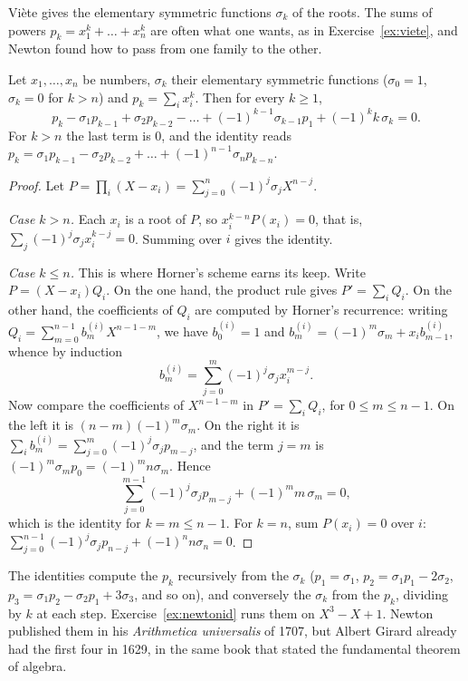Vi\`ete gives the elementary symmetric functions $\sigma_k$ of the roots. The sums of powers $p_k=x_1^k+\dots+x_n^k$ are often what one wants, as
in Exercise~\ref{ex:viete}, and Newton found how to pass from one family to the other.

\begin{proposition}\label{prop:newtonid}
Let $x_1,\dots,x_n$ be numbers, $\sigma_k$ their elementary symmetric functions ($\sigma_0=1$, $\sigma_k=0$ for $k>n$) and $p_k=\sum_ix_i^k$.
Then for every $k\ge1$,
\[
p_k-\sigma_1p_{k-1}+\sigma_2p_{k-2}-\dots+(-1)^{k-1}\sigma_{k-1}p_1+(-1)^kk\,\sigma_k=0.
\]
For $k>n$ the last term is $0$, and the identity reads $p_k=\sigma_1p_{k-1}-\sigma_2p_{k-2}+\dots+(-1)^{n-1}\sigma_np_{k-n}$.
\end{proposition}
\begin{proof}
Let $P=\prod_i(X-x_i)=\sum_{j=0}^n(-1)^j\sigma_jX^{n-j}$.

\emph{Case $k>n$.} Each $x_i$ is a root of $P$, so $x_i^{k-n}P(x_i)=0$, that is, $\sum_j(-1)^j\sigma_jx_i^{k-j}=0$. Summing over $i$ gives the identity.

\emph{Case $k\le n$.} This is where Horner's scheme earns its keep. Write $P=(X-x_i)Q_i$. On the one hand, the product rule gives
$P'=\sum_iQ_i$. On the other hand, the coefficients of $Q_i$ are computed by Horner's recurrence: writing $Q_i=\sum_{m=0}^{n-1}b_m^{(i)}X^{n-1-m}$,
we have $b_0^{(i)}=1$ and $b_m^{(i)}=(-1)^m\sigma_m+x_ib_{m-1}^{(i)}$, whence by induction
\[
b_m^{(i)}=\sum_{j=0}^m(-1)^j\sigma_jx_i^{m-j}.
\]
Now compare the coefficients of $X^{n-1-m}$ in $P'=\sum_iQ_i$, for $0\le m\le n-1$. On the left it is $(n-m)(-1)^m\sigma_m$. On the right it is
$\sum_ib_m^{(i)}=\sum_{j=0}^m(-1)^j\sigma_jp_{m-j}$, and the term $j=m$ is $(-1)^m\sigma_mp_0=(-1)^mn\sigma_m$. Hence
\[
\sum_{j=0}^{m-1}(-1)^j\sigma_jp_{m-j}+(-1)^mm\,\sigma_m=0,
\]
which is the identity for $k=m\le n-1$. For $k=n$, sum $P(x_i)=0$ over $i$: $\sum_{j=0}^{n-1}(-1)^j\sigma_jp_{n-j}+(-1)^nn\sigma_n=0$.
\end{proof}

The identities compute the $p_k$ recursively from the $\sigma_k$ ($p_1=\sigma_1$, $p_2=\sigma_1p_1-2\sigma_2$, $p_3=\sigma_1p_2-\sigma_2p_1+3\sigma_3$,
and so on), and conversely the $\sigma_k$ from the $p_k$, dividing by $k$ at each step. Exercise~\ref{ex:newtonid} runs them on $X^3-X+1$. Newton
published them in his \emph{Arithmetica universalis} of 1707, but Albert Girard already had the first four in 1629, in the same book that stated the
fundamental theorem of algebra.


